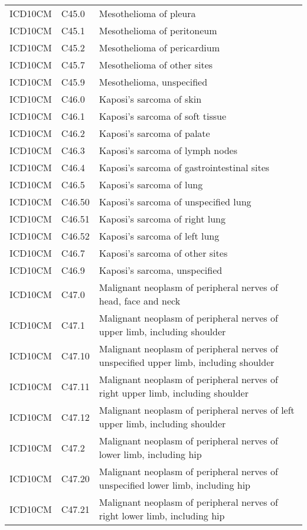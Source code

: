 \begin{table}[ht]
\begin{tabular}{lll}
  ICD10CM & C45.0 & Mesothelioma of pleura \\ 
  ICD10CM & C45.1 & Mesothelioma of peritoneum \\ 
  ICD10CM & C45.2 & Mesothelioma of pericardium \\ 
  ICD10CM & C45.7 & Mesothelioma of other sites \\ 
  ICD10CM & C45.9 & Mesothelioma, unspecified \\ 
  ICD10CM & C46.0 & Kaposi's sarcoma of skin \\ 
  ICD10CM & C46.1 & Kaposi's sarcoma of soft tissue \\ 
  ICD10CM & C46.2 & Kaposi's sarcoma of palate \\ 
  ICD10CM & C46.3 & Kaposi's sarcoma of lymph nodes \\ 
  ICD10CM & C46.4 & Kaposi's sarcoma of gastrointestinal sites \\ 
  ICD10CM & C46.5 & Kaposi's sarcoma of lung \\ 
  ICD10CM & C46.50 & Kaposi's sarcoma of unspecified lung \\ 
  ICD10CM & C46.51 & Kaposi's sarcoma of right lung \\ 
  ICD10CM & C46.52 & Kaposi's sarcoma of left lung \\ 
  ICD10CM & C46.7 & Kaposi's sarcoma of other sites \\ 
  ICD10CM & C46.9 & Kaposi's sarcoma, unspecified \\ 
  ICD10CM & C47.0 & Malignant neoplasm of peripheral nerves of head, face and neck \\ 
  ICD10CM & C47.1 & Malignant neoplasm of peripheral nerves of upper limb, including shoulder \\ 
  ICD10CM & C47.10 & Malignant neoplasm of peripheral nerves of unspecified upper limb, including shoulder \\ 
  ICD10CM & C47.11 & Malignant neoplasm of peripheral nerves of right upper limb, including shoulder \\ 
  ICD10CM & C47.12 & Malignant neoplasm of peripheral nerves of left upper limb, including shoulder \\ 
  ICD10CM & C47.2 & Malignant neoplasm of peripheral nerves of lower limb, including hip \\ 
  ICD10CM & C47.20 & Malignant neoplasm of peripheral nerves of unspecified lower limb, including hip \\ 
  ICD10CM & C47.21 & Malignant neoplasm of peripheral nerves of right lower limb, including hip \\ 

\end{tabular}
\end{table}
